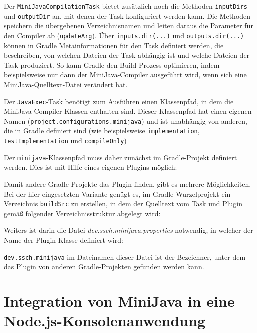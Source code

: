 

Der \lstinline{MiniJavaCompilationTask} bietet zusätzlich noch die Methoden \lstinline{inputDirs} und \lstinline{outputDir} an, mit denen der Task konfiguriert werden kann. Die Methoden speichern die übergebenen Verzeichnisnamen und leiten daraus die Parameter für den Compiler ab (\lstinline{updateArg}). Über \lstinline{inputs.dir(...)} und \lstinline{outputs.dir(...)} können in Gradle Metainformationen für den Task definiert werden, die beschreiben, von welchen Dateien der Task abhängig ist und welche Dateien der Task produziert. So kann Gradle den Build-Prozess optimieren, indem beispielsweise nur dann der MiniJava-Compiler ausgeführt wird, wenn sich eine MiniJava-Quelltext-Datei verändert hat.

Der \lstinline{JavaExec}-Task benötigt zum Ausführen einen Klassenpfad, in dem die MiniJava-Compiler-Klassen enthalten sind. Dieser Klassenpfad hat einen eigenen Namen (\lstinline{project.configurations.minijava}) und ist unabhängig von anderen, die in Gradle definiert sind (wie beispielsweise \lstinline{implementation}, \lstinline{testImplementation} und \lstinline{compileOnly})

Der \lstinline{minijava}-Klassenpfad muss daher zunächst im Gradle-Projekt definiert werden. Dies ist mit Hilfe eines eigenen Plugins möglich:



Damit andere Gradle-Projekte das Plugin finden, gibt es mehrere Möglichkeiten. Bei der hier eingesetzten Variante genügt es, im Gradle-Wurzelprojekt ein Verzeichnis \lstinline{buildSrc} zu erstellen, in dem der Quelltext vom Task und Plugin gemäß folgender Verzeichnisstruktur abgelegt wird:



Weiters ist darin die Datei \emph{dev.ssch.minijava.properties} notwendig, in welcher der Name der Plugin-Klasse definiert wird:



\lstinline{dev.ssch.minijava} im Dateinamen dieser Datei ist der Bezeichner, unter dem das Plugin von anderen Gradle-Projekten gefunden werden kann.

\section{Integration von MiniJava in eine Node.js-Konsolenanwendung}
\label{sec:NodeJSExample}

